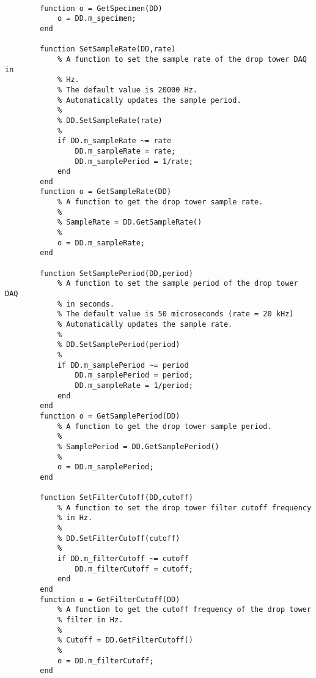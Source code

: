 \begin{lstlisting}
        
        function o = GetSpecimen(DD)
            o = DD.m_specimen;
        end
        
        function SetSampleRate(DD,rate)
            % A function to set the sample rate of the drop tower DAQ in
            % Hz.
            % The default value is 20000 Hz.
            % Automatically updates the sample period.
            %
            % DD.SetSampleRate(rate)
            %
            if DD.m_sampleRate ~= rate
                DD.m_sampleRate = rate;
                DD.m_samplePeriod = 1/rate;
            end
        end
        function o = GetSampleRate(DD)
            % A function to get the drop tower sample rate.
            %
            % SampleRate = DD.GetSampleRate()
            %
            o = DD.m_sampleRate;
        end
        
        function SetSamplePeriod(DD,period)
            % A function to set the sample period of the drop tower DAQ
            % in seconds.
            % The default value is 50 microseconds (rate = 20 kHz)
            % Automatically updates the sample rate.
            %
            % DD.SetSamplePeriod(period)
            %
            if DD.m_samplePeriod ~= period
                DD.m_samplePeriod = period;
                DD.m_sampleRate = 1/period;
            end
        end
        function o = GetSamplePeriod(DD)
            % A function to get the drop tower sample period.
            %
            % SamplePeriod = DD.GetSamplePeriod()
            %
            o = DD.m_samplePeriod;
        end
        
        function SetFilterCutoff(DD,cutoff)
            % A function to set the drop tower filter cutoff frequency
            % in Hz.
            %
            % DD.SetFilterCutoff(cutoff)
            %
            if DD.m_filterCutoff ~= cutoff
                DD.m_filterCutoff = cutoff;
            end
        end
        function o = GetFilterCutoff(DD)
            % A function to get the cutoff frequency of the drop tower
            % filter in Hz.
            %
            % Cutoff = DD.GetFilterCutoff()
            %
            o = DD.m_filterCutoff;
        end
        

\end{lstlisting}
